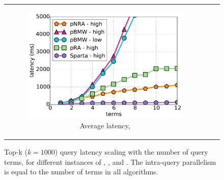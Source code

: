 \begin{figure}[tbh]
\begin{tabular}{ccc}
    \begin{subfigure}[t]{0.33\textwidth}
    \includegraphics[width=\textwidth]{figures/latency_12threads_cluewebX10.pdf}
	\caption{Average latency, \cwten}
    \end{subfigure}  
\end{tabular}
\caption{Top-k ($k=1000$) query latency scaling with the number of query terms, for different instances of \alg, \pRA, and \pBMW. 
The intra-query parallelism is equal to the number of terms in all algorithms. }
\label{fig:terms-scaling}
\end{figure}



